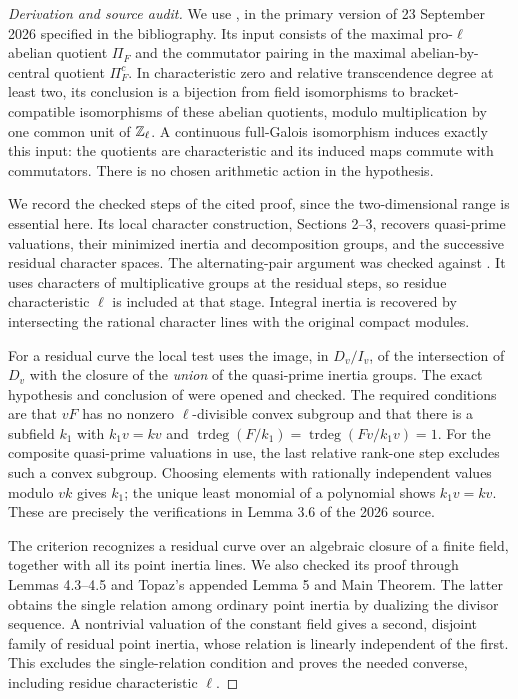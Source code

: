 \begin{proof}[Derivation and source audit]
We use \cite[Theorem 1.1]{OAI2026BogomolovPop}, in the primary
version of 23 September 2026 specified in the bibliography.  Its
input consists of the maximal pro-$\ell$ abelian quotient
$\Pi_F$ and the commutator pairing in the maximal
abelian-by-central quotient $\Pi_F^c$.  In characteristic zero
and relative transcendence degree at least two, its conclusion
is a bijection from field isomorphisms to bracket-compatible
isomorphisms of these abelian quotients, modulo multiplication
by one common unit of $\mathbb Z_\ell$.  A continuous full-Galois
isomorphism induces exactly this input: the quotients are
characteristic and its induced maps commute with commutators.
There is no chosen arithmetic action in the hypothesis.

We record the checked steps of the cited proof, since the
two-dimensional range is essential here.  Its local character
construction, Sections 2--3, recovers quasi-prime valuations,
their minimized inertia and decomposition groups, and the
successive residual character spaces.  The alternating-pair
argument was checked against \cite[Section 2 and Theorem 3.3]{Topaz2019Integral}.
It uses characters of multiplicative groups at the residual
steps, so residue characteristic $\ell$ is included at that
stage.  Integral inertia is recovered by intersecting the
rational character lines with the original compact modules.

For a residual curve the local test uses the image, in
$D_v/I_v$, of the intersection of $D_v$ with the closure of
the \emph{union} of the quasi-prime inertia groups.
The exact hypothesis and conclusion of
\cite[Section 4, Theorem 4.2(i)(a)]{Pop2015Minimized}
were opened and checked.  The required conditions are that
$vF$ has no nonzero $\ell$-divisible convex subgroup and that
there is a subfield $k_1$ with
$k_1v=kv$ and
$\operatorname{trdeg}(F/k_1)=\operatorname{trdeg}(Fv/k_1v)=1$.
For the composite quasi-prime valuations in use, the last
relative rank-one step excludes such a convex subgroup.
Choosing elements with rationally independent values modulo
$vk$ gives $k_1$; the unique least monomial of a polynomial
shows $k_1v=kv$.  These are precisely the verifications in
Lemma 3.6 of the 2026 source.

The criterion recognizes a residual curve over an algebraic
closure of a finite field, together with all its point inertia
lines.  We also checked its proof through Lemmas 4.3--4.5 and
Topaz's appended Lemma 5 and Main Theorem.  The latter obtains
the single relation among ordinary point inertia by dualizing
the divisor sequence.  A nontrivial valuation of the constant
field gives a second, disjoint family of residual point inertia,
whose relation is linearly independent of the first.  This
excludes the single-relation condition and proves the needed
converse, including residue characteristic $\ell$.


\end{proof}
